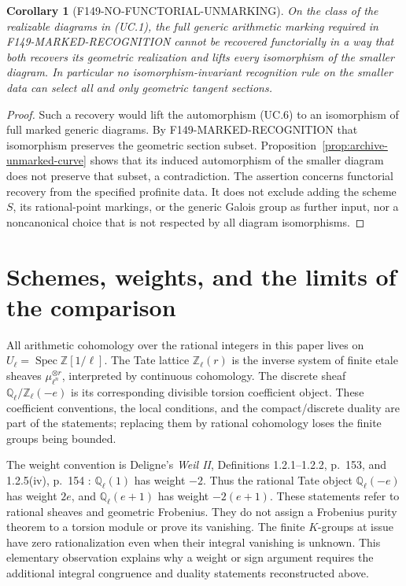 \documentclass[11pt,a4paper]{article}
\newtheorem{corollary}[theorem]{Corollary}
\theoremstyle{definition}
\begin{document}
\begin{corollary}[F149-NO-FUNCTORIAL-UNMARKING]
\label{cor:archive-no-unmarking}
On the class of the realizable diagrams in (UC.1), the full
generic arithmetic marking required in
F149-MARKED-RECOGNITION cannot be recovered functorially in a way
that both recovers its geometric realization and lifts every
isomorphism of the smaller diagram. In particular no
isomorphism-invariant recognition rule on the smaller data can
select all and only geometric tangent sections.
\end{corollary}

\begin{proof}
Such a recovery would lift the automorphism (UC.6) to an
isomorphism of full marked generic diagrams. By
F149-MARKED-RECOGNITION that isomorphism preserves the geometric
section subset. Proposition~\ref{prop:archive-unmarked-curve}
shows that its induced automorphism of the smaller diagram does
not preserve that subset, a contradiction.
The assertion concerns functorial recovery from the specified
profinite data. It does not exclude adding the scheme $S$, its
rational-point markings, or the generic Galois group as further
input, nor a noncanonical choice that is not respected by
all diagram isomorphisms.
\end{proof}

\section{Schemes, weights, and the limits of the comparison}
\label{sec:framework}

All arithmetic cohomology over the rational integers in this paper lives on
$U_\ell=\operatorname{Spec}\mathbb Z[1/\ell]$. The Tate lattice
$\mathbb Z_\ell(r)$ is the inverse system of finite etale sheaves
$\mu_{\ell^n}^{\otimes r}$, interpreted by continuous cohomology.
The discrete sheaf $\mathbb Q_\ell/\mathbb Z_\ell(-e)$ is its corresponding
divisible torsion coefficient object. These coefficient conventions,
the local conditions, and the compact/discrete duality are part of the
statements; replacing them by rational cohomology loses the finite groups
being bounded.

The weight convention is Deligne's \emph{Weil II}, Definitions 1.2.1--1.2.2,
p.~153, and 1.2.5(iv), p.~154 \cite{DeligneWeilII}: $\mathbb Q_\ell(1)$ has weight $-2$.
Thus the rational Tate object $\mathbb Q_\ell(-e)$ has weight $2e$,
and $\mathbb Q_\ell(e+1)$ has weight $-2(e+1)$. These statements refer
to rational sheaves and geometric Frobenius. They do not assign a
Frobenius purity theorem to a torsion module or prove its vanishing.
The finite $K$-groups at issue have zero rationalization even when their
integral vanishing is unknown. This elementary observation explains why
a weight or sign argument requires the additional integral congruence
and duality statements reconstructed above.
\end{document}
